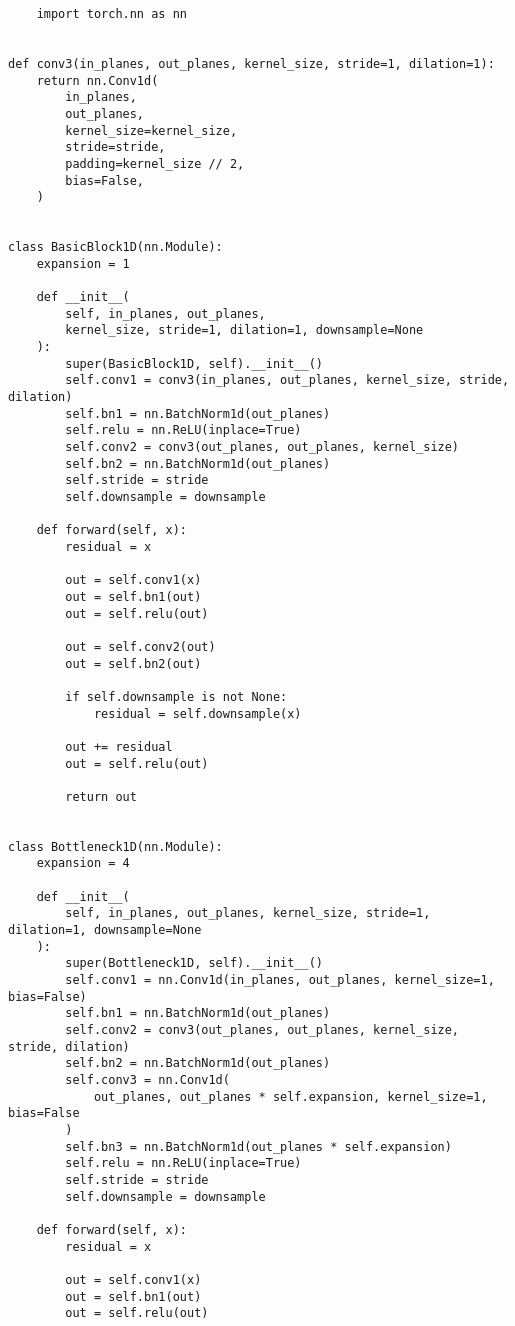 \documentclass[
thesis  %
]{csthes}
\begin{document}
\begin{lstlisting}
    import torch.nn as nn


def conv3(in_planes, out_planes, kernel_size, stride=1, dilation=1):
    return nn.Conv1d(
        in_planes,
        out_planes,
        kernel_size=kernel_size,
        stride=stride,
        padding=kernel_size // 2,
        bias=False,
    )


class BasicBlock1D(nn.Module):
    expansion = 1

    def __init__(
        self, in_planes, out_planes, 
        kernel_size, stride=1, dilation=1, downsample=None
    ):
        super(BasicBlock1D, self).__init__()
        self.conv1 = conv3(in_planes, out_planes, kernel_size, stride, dilation)
        self.bn1 = nn.BatchNorm1d(out_planes)
        self.relu = nn.ReLU(inplace=True)
        self.conv2 = conv3(out_planes, out_planes, kernel_size)
        self.bn2 = nn.BatchNorm1d(out_planes)
        self.stride = stride
        self.downsample = downsample

    def forward(self, x):
        residual = x

        out = self.conv1(x)
        out = self.bn1(out)
        out = self.relu(out)

        out = self.conv2(out)
        out = self.bn2(out)

        if self.downsample is not None:
            residual = self.downsample(x)

        out += residual
        out = self.relu(out)

        return out


class Bottleneck1D(nn.Module):
    expansion = 4

    def __init__(
        self, in_planes, out_planes, kernel_size, stride=1, dilation=1, downsample=None
    ):
        super(Bottleneck1D, self).__init__()
        self.conv1 = nn.Conv1d(in_planes, out_planes, kernel_size=1, bias=False)
        self.bn1 = nn.BatchNorm1d(out_planes)
        self.conv2 = conv3(out_planes, out_planes, kernel_size, stride, dilation)
        self.bn2 = nn.BatchNorm1d(out_planes)
        self.conv3 = nn.Conv1d(
            out_planes, out_planes * self.expansion, kernel_size=1, bias=False
        )
        self.bn3 = nn.BatchNorm1d(out_planes * self.expansion)
        self.relu = nn.ReLU(inplace=True)
        self.stride = stride
        self.downsample = downsample

    def forward(self, x):
        residual = x

        out = self.conv1(x)
        out = self.bn1(out)
        out = self.relu(out)


\end{lstlisting}
\end{document}
